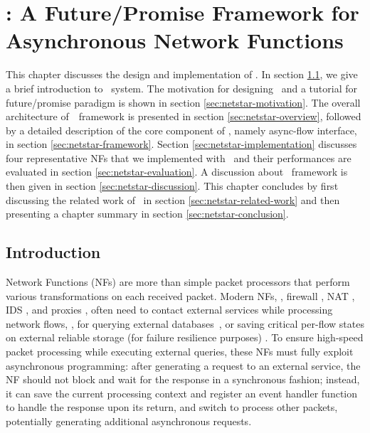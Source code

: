 \chapter {\netstar: A Future/Promise Framework for Asynchronous Network Functions}
\label{ch:netstar}

This chapter discusses the design and implementation of \netstar. In section \ref{sec:netstar-introduction}, we give a brief introduction to \netstar~system. The motivation for designing \netstar~and a tutorial for future/promise paradigm is shown in section \ref{sec:netstar-motivation}. The overall architecture of~\netstar~framework is presented in section \ref{sec:netstar-overview}, followed by a detailed description of the core component of \netstar, namely async-flow interface, in section \ref{sec:netstar-framework}. Section \ref{sec:netstar-implementation} discusses four representative NFs that we implemented with \netstar~and their performances are evaluated in section \ref{sec:netstar-evaluation}. A discussion about \netstar~framework is then given in section \ref{sec:netstar-discussion}. This chapter concludes by first discussing the related work of \netstar~in section \ref{sec:netstar-related-work} and then presenting a chapter summary in section \ref{sec:netstar-conclusion}.

\section{Introduction} \label{sec:netstar-introduction}

Network Functions (NFs) are more than simple packet processors that perform various transformations on each received packet. Modern NFs, \eg, firewall \cite{201545}, NAT \cite{201545}, IDS \cite{bro}, and proxies \cite{haproxy, project-clearwater}, often need to contact external services while processing network flows, \eg, for
querying external databases~\cite{telephone-number-mapping, bro-scripting-tutorial}, or saving critical per-flow states on external reliable storage (for failure resilience purposes) \cite{201545}. To ensure high-speed packet processing while executing external queries, these NFs must fully exploit asynchronous programming: after generating a request to an external service, the NF should not block and wait for the response in a synchronous fashion; instead, it can save the current processing context and register an event handler function to handle the response upon its return, and switch to process other packets, potentially generating additional asynchronous requests.

